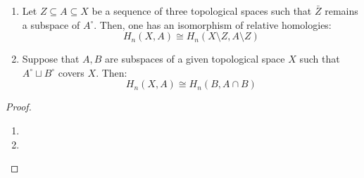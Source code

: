             \begin{theorem}[Excision] \label{theorem: excision}
                
                \begin{enumerate}
                    \item Let $Z \subseteq A \subseteq X$ be a sequence of three topological spaces such that $\bar{Z}$ remains a subspace of $A^{\circ}$. Then, one has an isomorphism of relative homologies:
                        $$H_n(X, A) \cong H_n(X \setminus Z, A \setminus Z)$$
                    \item Suppose that $A, B$ are subspaces of a given topological space $X$ such that $A^{\circ} \sqcup B^{\circ}$ covers $X$. Then:
                        $$H_n(X, A) \cong H_n(B, A \cap B)$$
                \end{enumerate}
            \end{theorem}
                \begin{proof}
                    
                    \begin{enumerate}
                        \item 
                        \item 
                    \end{enumerate}
                \end{proof}

